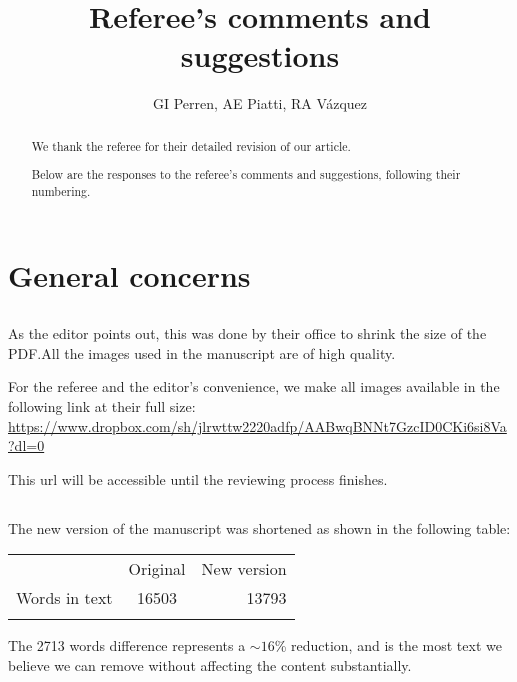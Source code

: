 \documentclass{article}
\begin{document}
\title{Referee's comments and suggestions}
\author{GI Perren, AE Piatti, RA V\'azquez}

\maketitle

\renewcommand\thesubsection{\Alph{subsection}}
\begin{abstract}
We thank the referee for their detailed revision of our article.

Below are the responses to the referee's comments and suggestions, following
their numbering.
\end{abstract}

\section*{General concerns}

\subsection{}
\label{gen_a}

As the editor points out, this was done by their office to shrink the size
of the PDF.\@ All the images used in the manuscript are of high quality.

For the referee and the editor's convenience, we make all images available in
the following link at their full size:
\url{https://www.dropbox.com/sh/jlrwttw2220adfp/AABwqBNNt7GzcID0CKi6si8Va?dl=0}

This url will be accessible until the reviewing process finishes.

\subsection{}
The new version of the manuscript was shortened as shown in the following
table:

\begin{tabular}{ l c r }
& Original & New version \\
Words in text & 16503 & 13793 \\\\ %
\end{tabular}

The 2713 words difference represents a ${\sim16}$\% reduction, and is the
most text we believe we can remove without affecting the content substantially.


\clearpage
\renewcommand\thesubsection{\arabic{subsection}}
\end{document}
